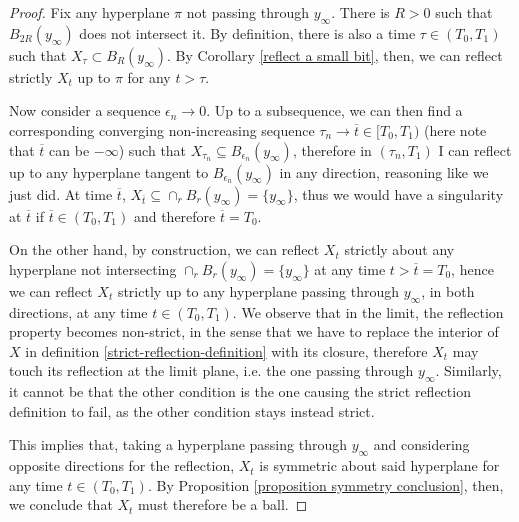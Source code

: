 \begin{proof}
	Fix any hyperplane $\pi$ not passing through $y_\infty$. There is $R>0$ such that $B_{2R}(y_\infty)$ does not intersect it. By definition, there is also a time  $\tau \in  (T_0, T_1)$ such that $X_\tau \subset B_R(y_\infty)$. 
	By Corollary \ref{reflect a small bit}, then, we can reflect strictly $X_t$ up to $\pi$ for any $t>\tau$. 
	
	Now consider a sequence  $\epsilon_n\rightarrow 0$. Up to a subsequence, we can then find a corresponding converging non-increasing sequence $\tau_n\rightarrow \overline{t}\in [T_0, T_1)$ (here note that $\overline{t}$ can be $-\infty$) such that $X_{\tau_n}\subseteq B_{\epsilon_n}(y_\infty)$, therefore in $(\tau_n, T_1)$ I can reflect up to any hyperplane tangent to  $B_{\epsilon_n}(y_\infty)$ in any direction, reasoning like we just did. At time $\overline{t}$, $X_{\overline{t}} \subseteq \cap_r B_{r}(y_\infty) = \{y_\infty\}$, thus we would have a singularity at $\overline{t}$ if  $\overline{t}\in(T_0, T_1)$ and therefore $\overline{t}=T_0$. 
	
	On the other hand, by construction, we can reflect $X_{t}$ strictly about any hyperplane not intersecting $\cap_r B_{r}(y_\infty) = \{y_\infty\}$ at any time $t>\overline{t}=T_0$, hence we can reflect $X_{t}$ strictly up to any hyperplane passing through $y_\infty$, in both directions, at any  time $t\in (T_0, T_1)$. We observe that in the limit, the reflection property becomes non-strict, in the sense that we have to replace the interior of $X$ in definition \ref{strict-reflection-definition} with its closure, therefore $X_{t}$ may touch its reflection at the limit plane, i.e. the one passing through $y_\infty$. Similarly, it cannot be that the other condition is the one causing the strict reflection definition to fail, as the other condition stays instead strict. 
	
	This implies that, taking a hyperplane passing through $y_\infty$ and considering opposite directions for the reflection, $X_{t}$ is symmetric about said hyperplane for any time $t\in (T_0, T_1)$. By Proposition \ref{proposition symmetry conclusion}, then, we conclude that $X_{t}$ must therefore be a ball.	
\end{proof}



